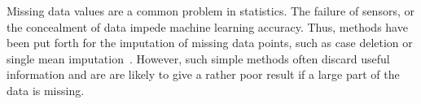 Missing data values are a common problem in statistics. The failure of
sensors, or the concealment of data impede machine learning
accuracy. Thus, methods have been put forth for the imputation of
missing data points, such as case deletion or single mean
imputation~\cite{schafer2002missing}. However, such simple methods
often discard useful information and are are likely to give a rather
poor result if a large part
of the data is missing.